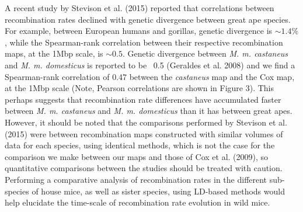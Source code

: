 A recent study by Stevison et al. (2015) reported that correlations between recombination rates declined with genetic divergence between great ape species. For example, between European humans and gorillas, genetic divergence is $\sim1.4\%$, while the Spearman-rank correlation between their respective recombination maps, at the 1Mbp scale, is $\sim0.5$. Genetic divergence between \emph{M. m. castaneus} and \emph{M. m. domesticus} is reported to be ~0.5 (Geraldes et al. 2008) and we find a Spearman-rank correlation of 0.47 between the \textit{castaneus} map and the Cox map, at the 1Mbp scale (Note, Pearson correlations are shown in Figure 3). This perhaps suggests that recombination rate differences have accumulated faster between \emph{M. m. castaneus} and \emph{M. m. domesticus} than it has between great apes. However, it should be noted that the comparisons performed by Stevison et al. (2015) were between recombination maps constructed with similar volumes of data for each species, using identical methods, which is not the case for the comparison we make between our maps and those of Cox et al. (2009), so quantitative comparisons between the studies should be treated with caution. Performing a comparative analysis of recombination rates in the different sub-species of house mice, as well as sister species, using LD-based methods would help elucidate the time-scale of recombination rate evolution in wild mice.

